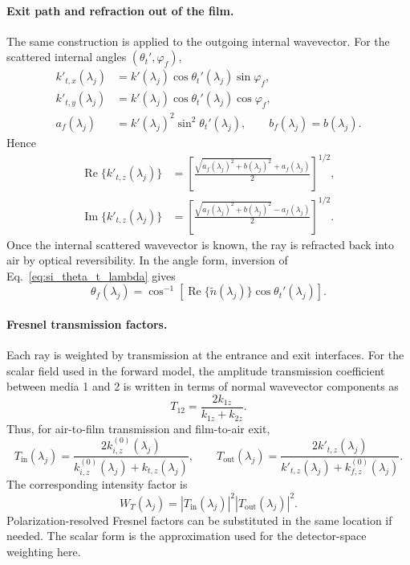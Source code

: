 \documentclass[11pt]{article}
\begin{document}
\paragraph{Exit path and refraction out of the film.}
The same construction is applied to the outgoing internal wavevector. For the scattered internal
angles $(\theta_t',\varphi_f)$,
\begin{align}
  k'_{t,x}(\lambda_j)
  &= k'(\lambda_j)\cos\theta_t'(\lambda_j)\sin\varphi_f,\\
  k'_{t,y}(\lambda_j)
  &= k'(\lambda_j)\cos\theta_t'(\lambda_j)\cos\varphi_f,\\
  a_f(\lambda_j)
  &= k'(\lambda_j)^2\sin^2\theta_t'(\lambda_j),
  \qquad
  b_f(\lambda_j)=b(\lambda_j).
  \label{eq:si_exit_af_lambda}
\end{align}
Hence
\begin{align}
  \operatorname{Re}\{k'_{t,z}(\lambda_j)\}
  &=
  \left[
  \frac{\sqrt{a_f(\lambda_j)^2+b(\lambda_j)^2}+a_f(\lambda_j)}{2}
  \right]^{1/2},\\
  \operatorname{Im}\{k'_{t,z}(\lambda_j)\}
  &=
  \left[
  \frac{\sqrt{a_f(\lambda_j)^2+b(\lambda_j)^2}-a_f(\lambda_j)}{2}
  \right]^{1/2}.
  \label{eq:si_exit_ktz_solution_lambda}
\end{align}
Once the internal scattered wavevector is known, the ray is refracted back into air by optical
reversibility. In the angle form, inversion of Eq.~\eqref{eq:si_theta_t_lambda} gives
\begin{equation}
  \theta_f(\lambda_j)
  =
  \cos^{-1}\!\left[
  \operatorname{Re}\{\tilde{n}(\lambda_j)\}\cos\theta_t'(\lambda_j)
  \right].
  \label{eq:si_exit_angle_lambda}
\end{equation}

\paragraph{Fresnel transmission factors.}
Each ray is weighted by transmission at the entrance and exit interfaces. For the scalar field used
in the forward model, the amplitude transmission coefficient between media 1 and 2 is written in
terms of normal wavevector components as
\begin{equation}
  T_{12}=\frac{2k_{1z}}{k_{1z}+k_{2z}}.
  \label{eq:si_scalar_transmission}
\end{equation}
Thus, for air-to-film transmission and film-to-air exit,
\begin{equation}
  T_{\mathrm{in}}(\lambda_j)
  =
  \frac{2k_{i,z}^{(0)}(\lambda_j)}{k_{i,z}^{(0)}(\lambda_j)+k_{t,z}(\lambda_j)},
  \qquad
  T_{\mathrm{out}}(\lambda_j)
  =
  \frac{2k'_{t,z}(\lambda_j)}{k'_{t,z}(\lambda_j)+k_{f,z}^{(0)}(\lambda_j)}.
  \label{eq:si_entry_exit_transmission}
\end{equation}
The corresponding intensity factor is
\begin{equation}
  W_T(\lambda_j)=|T_{\mathrm{in}}(\lambda_j)|^2 |T_{\mathrm{out}}(\lambda_j)|^2.
  \label{eq:si_transmission_intensity}
\end{equation}
Polarization-resolved Fresnel factors can be substituted in the same location if needed. The scalar
form is the approximation used for the detector-space weighting here.
\end{document}
